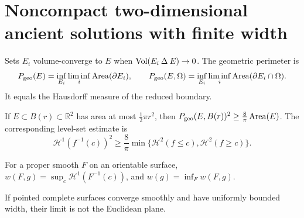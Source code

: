 \section{Noncompact two-dimensional ancient solutions with finite width}

\begin{definition}
\label{def:chow-iv-volume-perimeter}

Sets \(E_i\) volume-converge to \(E\) when \(\operatorname{Vol}(E_i\mathbin\Delta E)\to0\).
The geometric perimeter is
\[
 P_{\rm geo}(E)=\inf_{E_i}\liminf_i\operatorname{Area}(\partial E_i),\qquad
 P_{\rm geo}(E,\Omega)=\inf_{E_i}\liminf_i\operatorname{Area}(\partial E_i\cap\Omega).
\]
It equals the Hausdorff measure of the reduced boundary.
\end{definition}

\begin{theorem}
\label{thm:chow-iv-relative-isoperimetric}

If \(E\subset B(r)\subset\mathbb R^2\) has area at most \(\frac12\pi r^2\),
then \(P_{\rm geo}(E,B(r))^2\ge\frac8\pi\operatorname{Area}(E)\).  The corresponding
level-set estimate is
\[
 \mathcal H^1(f^{-1}(c))^2\ge\frac8\pi\min\{\mathcal H^2(f\le c),\mathcal H^2(f\ge c)\}.
\]
\end{theorem}

\begin{definition}[Width]
\label{def:chow-iv-width}

For a proper smooth \(F\) on an orientable surface,
\(w(F,g)=\sup_c\mathcal H^1(F^{-1}(c))\), and \(w(g)=\inf_F w(F,g)\).
\end{definition}

\begin{lemma}
\label{lem:chow-iv-width-not-euclidean}

If pointed complete surfaces converge smoothly and have uniformly bounded
width, their limit is not the Euclidean plane.
\end{lemma}

